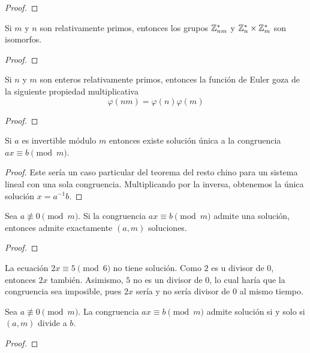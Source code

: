 \documentclass[main.tex]{subfiles}
\begin{document}
\begin{proof}
    
\end{proof}

\begin{proposition}
    Si $m$ y $n$ son relativamente primos, entonces los grupos $\mathbb Z_{nm}^*$ y $\mathbb Z_n^*\times\mathbb Z_m^*$ son isomorfos.
\end{proposition}

\begin{proof}
    
\end{proof}

\begin{lemma}
    Si $n$ y $m$ son enteros relativamente primos, entonces la funci\'on de Euler goza de la siguiente propiedad multiplicativa
    $$\varphi(nm) = \varphi(n)\varphi(m)$$
\end{lemma}

\begin{proof}
    
\end{proof}

\begin{proposition}
    Si $a$ es invertible m\'odulo $m$ entonces existe soluci\'on \'unica a la congruencia $ax \equiv b \pmod{m}$.
\end{proposition}

\begin{proof}
    Este ser\'ia un caso particular del teorema del resto chino para un sistema lineal con una sola congruencia. Multiplicando por la inversa, obtenemos la \'unica soluci\'on $x = a^{-1}b$.
\end{proof}

\begin{proposition}
    Sea $a \not\equiv 0 \pmod{m}$. Si la congruencia $ax\equiv b\pmod{m}$ admite una soluci\'on, entonces admite exactamente $(a, m)$ soluciones.
\end{proposition}

\begin{proof}
    
\end{proof}

\begin{example}
    La ecuaci\'on $2x\equiv5\pmod{6}$ no tiene soluci\'on. Como $2$ es u divisor de $0$, entonces $2x$ tambi\'en. Asimismo, $5$ no es un divisor de $0$, lo cual har\'ia que la congruencia sea imposible, pues $2x$ ser\'ia y no ser\'ia divisor de $0$ al mismo tiempo.
\end{example}

\begin{proposition}
    Sea $a \not\equiv 0 \pmod{m}$. La congruencia $ax\equiv b\pmod{m}$ admite soluci\'on si y solo si $(a, m)$ divide a $b$.
\end{proposition}

\begin{proof}
    
\end{proof}
\end{document}
